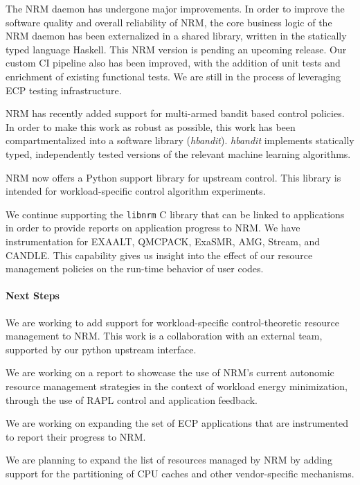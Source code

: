 The NRM daemon has undergone major improvements. In order to improve the
software quality and overall reliability of NRM, the core business logic
of the NRM daemon has been externalized in a shared library, written in the
statically typed language Haskell. This NRM version is pending an upcoming
release. Our custom CI pipeline also has been improved, with the addition
of unit tests and enrichment of existing functional tests. We are still in
the process of leveraging ECP testing infrastructure.

NRM has recently added support for multi-armed bandit based control policies.
In order to make this work as robust as possible, this work has been
compartmentalized into a software library (\textit{hbandit}). \textit{hbandit}
implements statically typed, independently tested versions of the relevant
machine learning algorithms.

NRM now offers a Python support library for upstream control. This library is
intended for workload-specific control algorithm experiments.

We continue supporting the \texttt{libnrm} C library that can be linked to
applications in order to provide reports on application progress to NRM. We have
instrumentation for EXAALT, QMCPACK, ExaSMR, AMG, Stream, and CANDLE.
This capability gives us insight into the effect of our resource management
policies on the run-time behavior of user codes.


\paragraph{Next Steps}

We are working to add support for workload-specific control-theoretic
resource management to NRM. This work is a collaboration with an external
team, supported by our python upstream interface.

We are working on a report to showcase the use of NRM's current autonomic
resource management strategies in the context of workload energy minimization,
through the use of RAPL control and application feedback.

We are working on expanding the set of ECP applications that are instrumented
to report their progress to NRM.

We are planning to expand the list of resources managed by NRM by
adding support for the partitioning of CPU caches and other vendor-specific
mechanisms.
